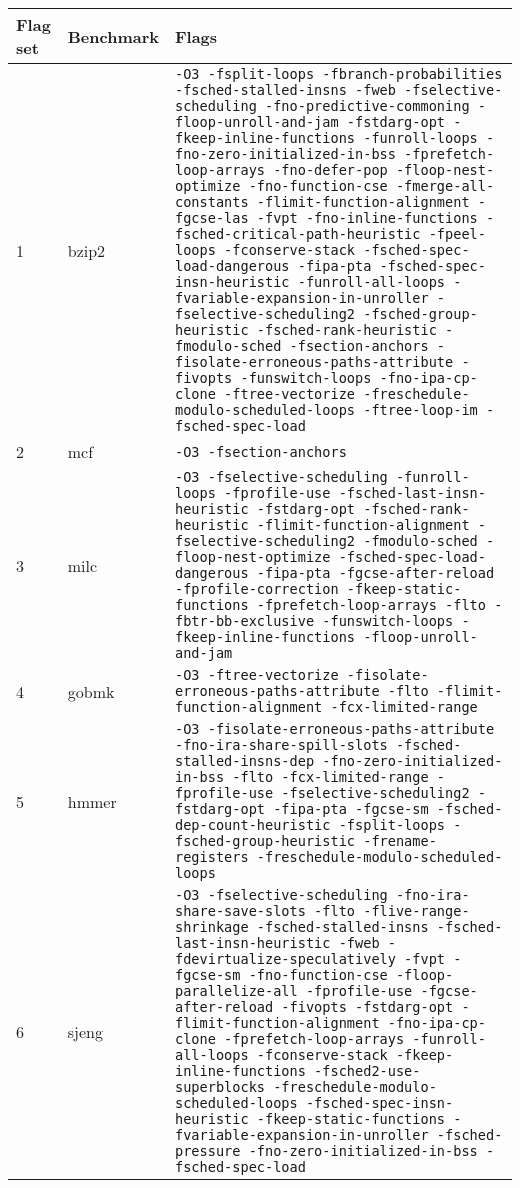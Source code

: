 \documentclass[twocolumn, 10pt]{article}
\begin{document}
    \centering
    \begin{tabularx}{\textwidth}{llX}
        \toprule
        Flag set & Benchmark & Flags \\
        \midrule
        \endhead
        1 & bzip2 & \texttt{-O3 -fsplit-loops -fbranch-probabilities -fsched-stalled-insns -fweb -fselective-scheduling -fno-predictive-commoning -floop-unroll-and-jam -fstdarg-opt -fkeep-inline-functions -funroll-loops -fno-zero-initialized-in-bss -fprefetch-loop-arrays -fno-defer-pop -floop-nest-optimize -fno-function-cse -fmerge-all-constants -flimit-function-alignment -fgcse-las -fvpt -fno-inline-functions -fsched-critical-path-heuristic -fpeel-loops -fconserve-stack -fsched-spec-load-dangerous -fipa-pta -fsched-spec-insn-heuristic -funroll-all-loops -fvariable-expansion-in-unroller -fselective-scheduling2 -fsched-group-heuristic -fsched-rank-heuristic -fmodulo-sched -fsection-anchors -fisolate-erroneous-paths-attribute -fivopts -funswitch-loops -fno-ipa-cp-clone -ftree-vectorize -freschedule-modulo-scheduled-loops -ftree-loop-im -fsched-spec-load} \\
        \midrule
        2 & mcf & \texttt{-O3 -fsection-anchors}\\
        \midrule
        3 & milc & \texttt{-O3 -fselective-scheduling -funroll-loops -fprofile-use -fsched-last-insn-heuristic -fstdarg-opt -fsched-rank-heuristic -flimit-function-alignment -fselective-scheduling2 -fmodulo-sched -floop-nest-optimize -fsched-spec-load-dangerous -fipa-pta -fgcse-after-reload -fprofile-correction -fkeep-static-functions -fprefetch-loop-arrays -flto -fbtr-bb-exclusive -funswitch-loops -fkeep-inline-functions -floop-unroll-and-jam} \\
        \midrule
        4 & gobmk & \texttt{-O3 -ftree-vectorize -fisolate-erroneous-paths-attribute -flto -flimit-function-alignment -fcx-limited-range} \\
        \midrule
        5 & hmmer & \texttt{-O3 -fisolate-erroneous-paths-attribute -fno-ira-share-spill-slots -fsched-stalled-insns-dep -fno-zero-initialized-in-bss -flto -fcx-limited-range -fprofile-use -fselective-scheduling2 -fstdarg-opt -fipa-pta -fgcse-sm -fsched-dep-count-heuristic -fsplit-loops -fsched-group-heuristic -frename-registers -freschedule-modulo-scheduled-loops} \\
        \midrule
        6 & sjeng & \texttt{-O3 -fselective-scheduling -fno-ira-share-save-slots -flto -flive-range-shrinkage -fsched-stalled-insns -fsched-last-insn-heuristic -fweb -fdevirtualize-speculatively -fvpt -fgcse-sm -fno-function-cse -floop-parallelize-all -fprofile-use -fgcse-after-reload -fivopts -fstdarg-opt -flimit-function-alignment -fno-ipa-cp-clone -fprefetch-loop-arrays -funroll-all-loops -fconserve-stack -fkeep-inline-functions -fsched2-use-superblocks -freschedule-modulo-scheduled-loops -fsched-spec-insn-heuristic -fkeep-static-functions -fvariable-expansion-in-unroller -fsched-pressure -fno-zero-initialized-in-bss -fsched-spec-load} \\

\end{tabularx}
\end{document}
